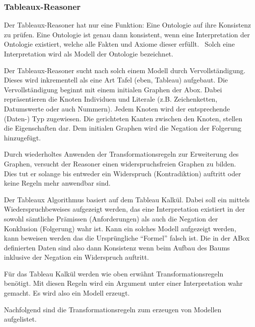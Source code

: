 \subsubsection{Tableaux-Reasoner}
\label{ssubsection:inferenz_pellet_tableaux}
Der Tableaux-Reasoner hat nur eine Funktion: Eine Ontologie auf ihre Konsistenz zu prüfen. Eine Ontologie ist genau dann konsistent, wenn eine Interpretation der Ontologie existiert, welche alle Fakten und Axiome dieser erfüllt.~\cite{w3owlsemantics} Solch eine Interpretation wird als Modell der Ontologie bezeichnet.

Der Tableaux-Reasoner sucht nach solch einem Modell durch Vervollständigung. Dieses wird inkrementell als eine Art Tafel (eben, Tableau) aufgebaut. Die Vervollständigung beginnt mit einem initialen Graphen der Abox. Dabei repräsentieren die Knoten Individuen und Literale (z.B. Zeichenketten, Datumswerte oder auch Nummern). Jedem Knoten wird der entsprechende (Daten-) Typ zugewiesen. Die gerichteten Kanten zwischen den Knoten, stellen die Eigenschaften dar. %
Dem initialen Graphen wird die Negation der Folgerung hinzugefügt.


Durch wiederholtes Anwenden der Transformationsregeln zur Erweiterung des Graphen, versucht der Reasoner einen widerspruchsfreien Graphen zu bilden. Dies tut er solange bis entweder ein Widerspruch (Kontradiktion) auftritt oder keine Regeln mehr anwendbar sind.

Der Tableaux Algorithmus basiert auf dem Tableau Kalkül. Dabei soll ein mittels Wiederspruchbeweises aufgezeigt werden, das eine Interpretation existiert in der sowohl sämtliche Prämissen (Anforderungen) als auch die Negation der Konklusion (Folgerung) wahr ist. Kann ein solches Modell aufgezeigt werden, kann beweisen werden das die Ursprüngliche "`Formel"' falsch ist. Die in der ABox definierten Daten sind also dann Konsistenz wenn beim Aufbau des Baums inklusive der Negation ein Widerspruch auftritt.

Für das Tableau Kalkül werden wie oben erwähnt Transformationsregeln benötigt. Mit diesen Regeln wird ein Argument unter einer Interpretation wahr gemacht. Es wird also ein Modell erzeugt.

Nachfolgend sind die Transformationsregeln zum erzeugen von Modellen aufgelistet.

